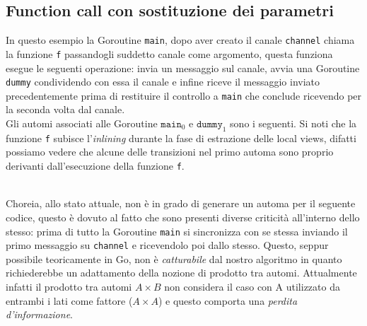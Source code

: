 \subsection{Function call con sostituzione dei parametri}
In questo esempio la Goroutine \texttt{main}, dopo aver creato il canale \texttt{channel} chiama la funzione \texttt{f} passandogli suddetto canale come argomento, questa funziona esegue le seguenti operazione: invia un messaggio sul canale, avvia una Goroutine \texttt{dummy} condividendo con essa il canale e infine riceve il messaggio inviato precedentemente prima di restituire il controllo a \texttt{main} che conclude ricevendo per la seconda volta dal canale. \bigskip \\

Gli automi associati alle Goroutine $\texttt{main}_0$ e $\texttt{dummy}_1$ sono i seguenti. Si noti che la funzione \texttt{f} subisce l'\emph{inlining} durante la fase di estrazione delle local views, difatti possiamo vedere che alcune delle transizioni nel primo automa sono proprio derivanti dall'esecuzione della funzione \texttt{f}.
\begin{figure}[h!]
\end{figure}\\
Choreia, allo stato attuale, non è in grado di generare un automa per il seguente codice, questo è dovuto al fatto che sono presenti diverse criticità all'interno dello stesso: prima di tutto la Goroutine \texttt{main} si sincronizza con se stessa inviando il primo messaggio su \texttt{channel} e ricevendolo poi dallo stesso. Questo, seppur possibile teoricamente in Go, non è \emph{catturabile} dal nostro algoritmo in quanto richiederebbe un adattamento della nozione di prodotto tra automi. Attualmente infatti il prodotto tra automi $A \times B$ non considera il caso con A utilizzato da entrambi i lati come fattore ($A \times A$) e questo comporta una \emph{perdita d'informazione}.\\
